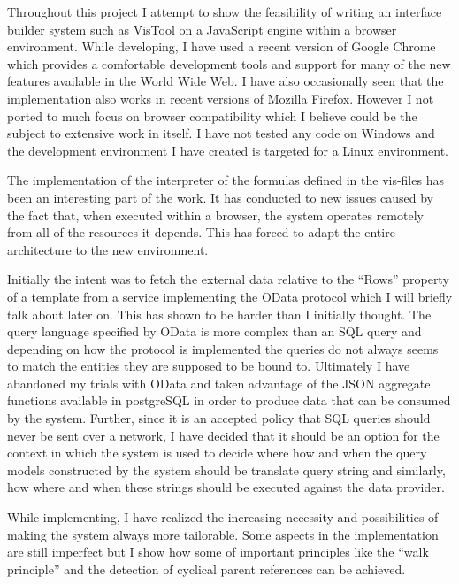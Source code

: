 Throughout this project I attempt to show the feasibility of writing an interface builder system such as VisTool on a JavaScript engine within a browser environment. While developing, I have used a recent version of Google Chrome which provides a comfortable development tools and support for many of the new features available in the World Wide Web. I have also occasionally seen that the implementation also works in recent versions of Mozilla Firefox. However I not ported to much focus on browser compatibility which I believe could be the subject to extensive work in itself. I have not tested any code on Windows and the development environment I have created is targeted for a Linux environment.

The implementation of the interpreter of the formulas defined in the vis-files has been an interesting part of the work. It has conducted to new issues caused by the fact that, when executed within a browser, the system operates remotely from all of the resources it depends. This has forced to adapt the entire architecture to the new environment.

Initially the intent was to fetch the external data relative to the ``Rows'' property of a template from a service implementing the OData protocol which I will briefly talk about later on. This has shown to be harder than I initially thought. The query language specified by OData is more complex than an SQL query and depending on how the protocol is implemented the queries do not always seems to match the entities they are supposed to be bound to. Ultimately I have abandoned my trials with OData and taken advantage of the JSON aggregate functions available in postgreSQL in order to produce data that can be consumed by the system. Further, since it is an accepted policy that SQL queries should never be sent over a network, I have decided that it should be an option for the context in which the system is used to decide where how and when the query models constructed by the system should be translate query string and similarly, how where and when these strings should be executed against the data provider.

While implementing, I have realized the increasing necessity and possibilities of making the system always more tailorable. Some aspects in the implementation are still imperfect but I show how some of important principles like the ``walk principle'' and the detection of cyclical parent references can be achieved.